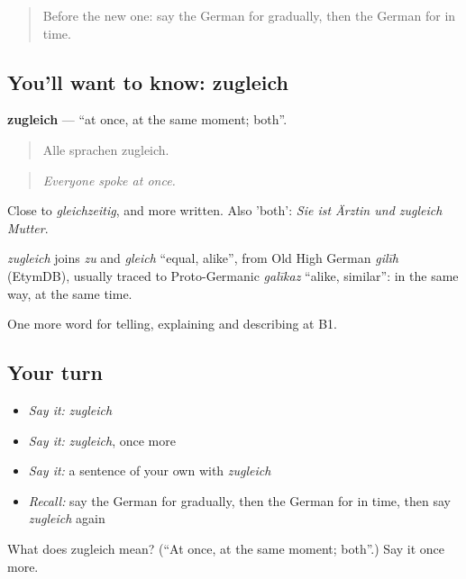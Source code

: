 \label{lesson:GE-C266-zugleich}



\begin{quote}
Before the new one: say the German for gradually, then the German for in time.
\end{quote}

\subsection*{You'll want to know: zugleich}
\textbf{zugleich} — \textquotedblleft{}at once, at the same moment; both\textquotedblright{}.

\begin{quote}
Alle sprachen zugleich.
\end{quote}

\begin{quote}
\emph{Everyone spoke at once.}
\end{quote}

Close to \emph{gleichzeitig}, and more written. Also 'both': \emph{Sie ist Ärztin und zugleich Mutter}.

\begin{cousinweb}
\emph{zugleich} joins \emph{zu} and \emph{gleich} \textquotedblleft{}equal, alike\textquotedblright{}, from Old High German \emph{gilīh} (EtymDB), usually traced to Proto-Germanic \emph{galīkaz} \textquotedblleft{}alike, similar\textquotedblright{}: in the same way, at the same time.
\end{cousinweb}

\begin{grammarlens}[title={What you've built}]
One more word for telling, explaining and describing at B1.
\end{grammarlens}

\subsection*{Your turn}
\begin{itemize}
\raggedright
  \item \emph{Say it:} \emph{zugleich}
  \item \emph{Say it:} \emph{zugleich}, once more
  \item \emph{Say it:} a sentence of your own with \emph{zugleich}
  \item \emph{Recall:} say the German for gradually, then the German for in time, then say \emph{zugleich} again
\end{itemize}

\begin{tcolorbox}[breakable,colback=teal!4,colframe=teal!35!black,title={Before you move on}]
What does zugleich mean? (\textquotedblleft{}At once, at the same moment; both\textquotedblright{}.) Say it once more.
\end{tcolorbox}
